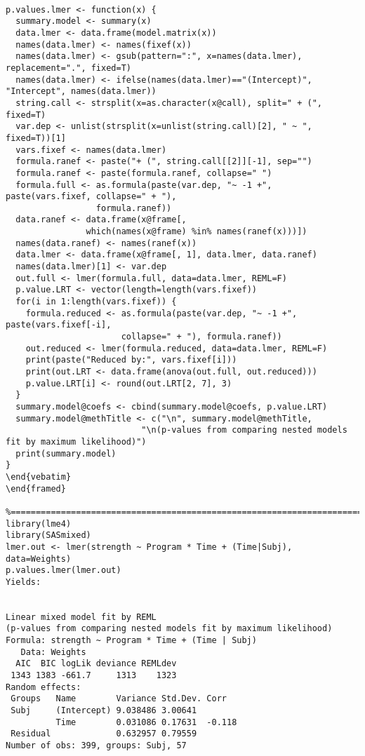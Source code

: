 \begin{framed}
\begin{verbatim}

p.values.lmer <- function(x) {
  summary.model <- summary(x)
  data.lmer <- data.frame(model.matrix(x))
  names(data.lmer) <- names(fixef(x))
  names(data.lmer) <- gsub(pattern=":", x=names(data.lmer), replacement=".", fixed=T)
  names(data.lmer) <- ifelse(names(data.lmer)=="(Intercept)", "Intercept", names(data.lmer))
  string.call <- strsplit(x=as.character(x@call), split=" + (", fixed=T)
  var.dep <- unlist(strsplit(x=unlist(string.call)[2], " ~ ", fixed=T))[1]
  vars.fixef <- names(data.lmer)
  formula.ranef <- paste("+ (", string.call[[2]][-1], sep="")
  formula.ranef <- paste(formula.ranef, collapse=" ")
  formula.full <- as.formula(paste(var.dep, "~ -1 +", paste(vars.fixef, collapse=" + "), 
                  formula.ranef))
  data.ranef <- data.frame(x@frame[, 
                which(names(x@frame) %in% names(ranef(x)))])
  names(data.ranef) <- names(ranef(x))
  data.lmer <- data.frame(x@frame[, 1], data.lmer, data.ranef)
  names(data.lmer)[1] <- var.dep
  out.full <- lmer(formula.full, data=data.lmer, REML=F)
  p.value.LRT <- vector(length=length(vars.fixef))
  for(i in 1:length(vars.fixef)) {
    formula.reduced <- as.formula(paste(var.dep, "~ -1 +", paste(vars.fixef[-i], 
                       collapse=" + "), formula.ranef))
    out.reduced <- lmer(formula.reduced, data=data.lmer, REML=F)
    print(paste("Reduced by:", vars.fixef[i]))
    print(out.LRT <- data.frame(anova(out.full, out.reduced)))
    p.value.LRT[i] <- round(out.LRT[2, 7], 3)
  }
  summary.model@coefs <- cbind(summary.model@coefs, p.value.LRT)
  summary.model@methTitle <- c("\n", summary.model@methTitle, 
                           "\n(p-values from comparing nested models fit by maximum likelihood)")
  print(summary.model)
}
\end{vebatim}
\end{framed}

%==============================================================================================================%
library(lme4)
library(SASmixed)
lmer.out <- lmer(strength ~ Program * Time + (Time|Subj), data=Weights)
p.values.lmer(lmer.out)
Yields:


Linear mixed model fit by REML 
(p-values from comparing nested models fit by maximum likelihood)
Formula: strength ~ Program * Time + (Time | Subj) 
   Data: Weights 
  AIC  BIC logLik deviance REMLdev
 1343 1383 -661.7     1313    1323
Random effects:
 Groups   Name        Variance Std.Dev. Corr   
 Subj     (Intercept) 9.038486 3.00641         
          Time        0.031086 0.17631  -0.118 
 Residual             0.632957 0.79559         
Number of obs: 399, groups: Subj, 57


\end{verbatim}
\end{framed}
